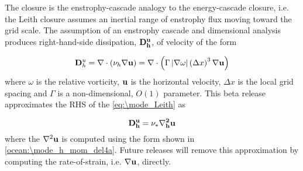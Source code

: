 The \cite{Leith:1996wu} closure is the enstrophy-cascade analogy to the \cite{Smagorinsky:1963wc} energy-cascade closure, i.e.  the Leith closure assumes an inertial range of enstrophy flux moving toward the grid scale. The assumption of an enstrophy cascade and dimensional analysis produces right-hand-side dissipation, $\bf{D}^u_h$, of velocity of the form

\begin{equation}
\label{eq:\mode_Leith}
{\bf D}^u_h =\nabla \cdot \left( \nu_h \nabla {\bf u} \right) = \nabla \cdot \left( \Gamma \left| \nabla \omega  \right| \left( \Delta x \right)^3 \nabla \bf{u} \right)
\end{equation}
where $\omega$ is the relative vorticity, ${\bf u}$ is the horizontal velocity, $\Delta x$ is the local grid spacing and $\Gamma$ is a non-dimensional, $O(1)$ parameter. This beta release approximates the RHS of the \ref{eq:\mode_Leith} as

\begin{equation}
\bf{D}^u_h=\nu_\ast \nabla_h^2 {\bf u}
\end{equation}
where the $\nabla^2 {\bf u}$ is computed using the form shown in \ref{ocean:\mode_h_mom_del4a}. Future releases will remove this approximation by computing the rate-of-strain, i.e. $\nabla {\bf u}$, directly.
